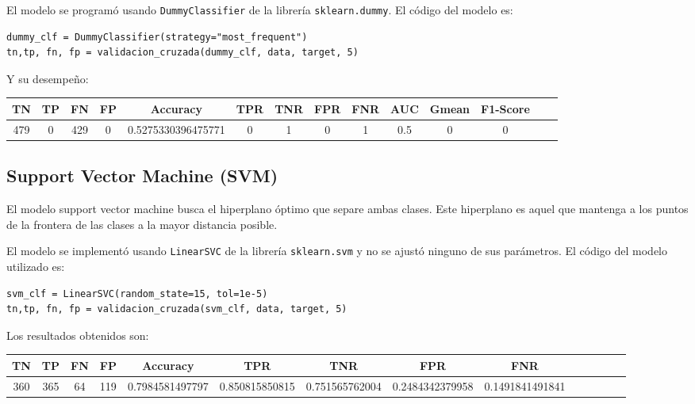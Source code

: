 \documentclass[a4]{article}
\begin{document}
El modelo se programó usando \texttt{DummyClassifier} de la librería \texttt{sklearn.dummy}. El código del modelo es:

\begin{lstlisting}
dummy_clf = DummyClassifier(strategy="most_frequent")
tn,tp, fn, fp = validacion_cruzada(dummy_clf, data, target, 5)
\end{lstlisting}

Y su desempeño:

\begin{center}
\begin{tabular}{|c|c|c|c|c|c|c|c|c|c|c|c|c|c|}
\hline
\multicolumn{1}{|c|}{\textbf{TN}}& \textbf{TP} & \textbf{FN} & \textbf{FP} & \textbf{Accuracy} & \textbf{TPR} & \textbf{TNR} & \textbf{FPR} &\textbf{FNR} & \textbf{AUC} & \textbf{Gmean} & \textbf{F1-Score}  \\ \hline
  479 & 0 & 429 & 0 & 0.5275330396475771 & 0 & 1 & 0 & 1 & 0.5 & 0 & 0  \\ \hline
\end{tabular}
\end{center}





\subsection{Support Vector Machine (SVM)}

El modelo support vector machine busca el hiperplano óptimo que separe ambas clases. Este hiperplano es aquel que  mantenga a los puntos de la frontera de las clases a la mayor distancia posible.

El modelo se implementó usando \texttt{LinearSVC} de la librería \texttt{sklearn.svm} y no se ajustó ninguno de sus parámetros. El código del modelo utilizado es:

\begin{lstlisting}
svm_clf = LinearSVC(random_state=15, tol=1e-5)
tn,tp, fn, fp = validacion_cruzada(svm_clf, data, target, 5)
\end{lstlisting}

Los resultados obtenidos son:

\begin{center}
\begin{tabular}{|c|c|c|c|c|c|c|c|c|c|c|c|c|c|}
\hline
\multicolumn{1}{|c|}{\textbf{TN}}& \textbf{TP} & \textbf{FN} & \textbf{FP} & \textbf{Accuracy} & \textbf{TPR} & \textbf{TNR} & \textbf{FPR} &\textbf{FNR} \\ \hline
  360 & 365 & 64 & 119 & 0.7984581497797 & 0.850815850815 & 0.751565762004 & 0.2484342379958 & 0.1491841491841 \\ \hline
\end{tabular}
\end{center}
\end{document}
